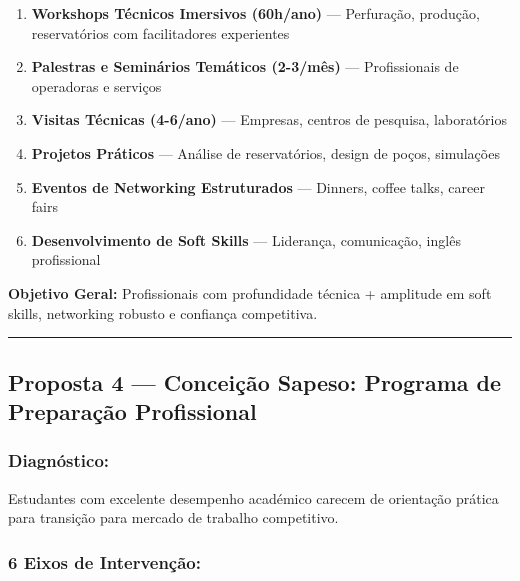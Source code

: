 \documentclass[12pt,a4paper]{article}
\begin{document}
\begin{enumerate}[itemsep=0.2cm]
    \item \textbf{Workshops Técnicos Imersivos (60h/ano)} — Perfuração, produção, reservatórios com facilitadores experientes
    
    \item \textbf{Palestras e Seminários Temáticos (2-3/mês)} — Profissionais de operadoras e serviços
    
    \item \textbf{Visitas Técnicas (4-6/ano)} — Empresas, centros de pesquisa, laboratórios
    
    \item \textbf{Projetos Práticos} — Análise de reservatórios, design de poços, simulações
    
    \item \textbf{Eventos de Networking Estruturados} — Dinners, coffee talks, career fairs
    
    \item \textbf{Desenvolvimento de Soft Skills} — Liderança, comunicação, inglês profissional
\end{enumerate}

\textbf{Objetivo Geral:} Profissionais com profundidade técnica + amplitude em soft skills, networking robusto e confiança competitiva.

\textcolor{spe-secondary}{\hspace{0.5cm}\rule{0.4\linewidth}{0.8pt}}

\subsection{Proposta 4 — Conceição Sapeso: Programa de Preparação Profissional}

\subsubsection*{Diagnóstico:}
Estudantes com excelente desempenho académico carecem de orientação prática para transição para mercado de trabalho competitivo.

\subsubsection*{6 Eixos de Intervenção:}
\end{document}

